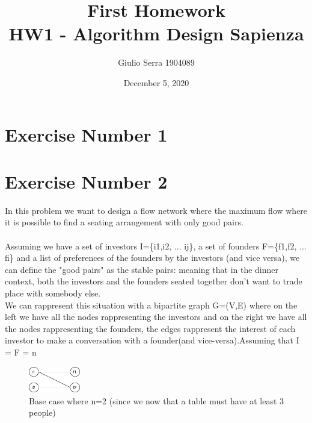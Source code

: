 \documentclass{article}
\begin{document}
\pagecolor{white}

\title{%
  First Homework \\
  \large HW1 - Algorithm Design Sapienza}

\author{Giulio Serra 1904089}
\date{December 5, 2020}

\maketitle

\begin{titlepage}
\end{titlepage}

\tableofcontents

\begin{titlepage}
\end{titlepage}

\section{Exercise Number 1 }


\newpage

\section{Exercise Number 2 }

In this problem we want to design a flow network where the maximum flow where it is possible to find a seating arrangement with only good pairs.\\\\Assuming we have a set of investors I=\{i1,i2, ... ij\}, a set of founders F=\{f1,f2, ... fi\} and a list of preferences of the founders by the investors (and vice versa), we can define the "good pairs" as the stable pairs: meaning that in the dinner context, both the investors and the founders seated together don't want to trade place with somebody else.\\
We can rappresent this situation with a bipartite graph G=(V,E) where on the left we have all the nodes rappresenting the investors and on the right we have all the nodes rappresenting the founders, the edges rappresent the interest of each investor to make a conversation with a founder(and vice-versa).Assuming that  {\textbar}I{\textbar} = {\textbar}F{\textbar} = n  

\begin{figure}[h]
		\centering
		\includegraphics[width=0.2\textwidth ]{EX1-AD.png}
		\caption{Base case where n=2 (since we now that a table must have at least 3 people)}
\end{figure}
\end{document}
